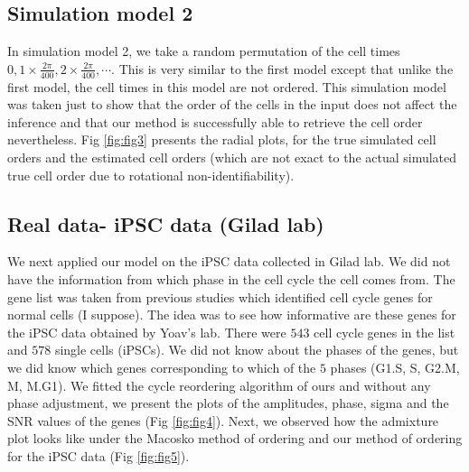 \documentclass[11pt]{article}
\begin{document}
\subsection{Simulation model 2}

In simulation model 2, we take a random permutation of the cell times $0, 1 \times \frac{2 \pi}{400}, 2 \times \frac{2 \pi}{400}, \cdots $. This is very similar to the first model except that unlike the first model, the cell times in this model are not ordered. This simulation model was taken just to show that the order of the cells in the input does not affect the inference and that our method is successfully able to retrieve the cell order nevertheless. Fig \ref{fig:fig3} presents the radial plots, for the true simulated cell orders and the estimated cell orders (which are not exact to the actual simulated true cell order due to rotational non-identifiability).

\subsection{Real data- iPSC data (Gilad lab)}

We next applied our model on the iPSC data collected in Gilad lab. We did not have the information from which phase in the cell cycle the cell comes from. The gene list was taken from previous studies which identified cell cycle genes for normal cells (I suppose). The idea was to see how informative are these genes for the iPSC data obtained by Yoav's lab. There were $543$ cell cycle genes in the list and $578$ single cells (iPSCs).  We did not know about the phases of the genes, but we did know which genes corresponding to which of the $5$ phases (G1.S, S, G2.M, M, M.G1).  We fitted the cycle reordering algorithm of ours and without any phase adjustment, we present the plots of the amplitudes, phase, sigma and the SNR values of the genes (Fig \ref{fig:fig4}). Next, we observed how the admixture plot looks like under the Macosko method of ordering and our method of ordering for the iPSC data (Fig \ref{fig:fig5}). 
\end{document}
